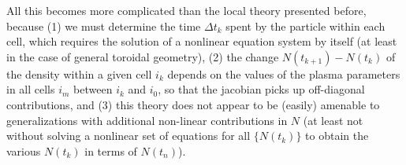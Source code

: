 \documentclass[11pt,a4paper]{article}
\begin{document}
All this becomes more complicated than the local theory presented before, because (1) we must determine the time $\Delta t_k$ spent by the particle within each cell, which requires the solution of a nonlinear equation system by itself (at least in the case of general toroidal geometry), (2) the change $N(t_{k+1}) - N(t_k)$ of the density within a given cell $i_k$ depends on the values of the plasma parameters in all cells $i_m$ between $i_k$ and $i_0$, so that the jacobian picks up off-diagonal contributions, and (3) this theory does not appear to be (easily) amenable to generalizations with additional non-linear contributions in $N$ (at least not without solving a nonlinear set of equations for all $\{N(t_k)\}$ to obtain the various $N(t_k)$ in terms of $N(t_n)$).
\end{document}
